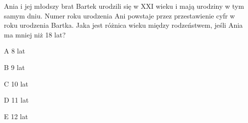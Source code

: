 \begin{tresc}
Ania i jej młodszy brat Bartek urodzili się w XXI wieku i mają urodziny w tym samym dniu. Numer roku urodzenia Ani powstaje przez przestawienie cyfr w roku urodzenia Bartka. Jaka jest różnica wieku między rodzeństwem, jeśli Ania ma mniej niż 18 lat?
\end{tresc}
\begin{wariant}{A} 8 lat \end{wariant}
\begin{wariant}{B} 9 lat \end{wariant}
\begin{wariant}{C} 10 lat \end{wariant}
\begin{wariant}{D} 11 lat \end{wariant}
\begin{wariant}{E} 12 lat \end{wariant}

